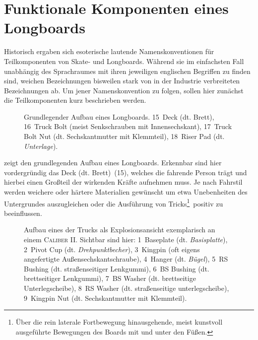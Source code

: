 	\section{Funktionale Komponenten eines Longboards}
		Historisch ergaben sich esoterische lautende Namenskonventionen für Teilkomponenten von Skate- und Longboards.
		Während sie im einfachsten Fall unabhängig des Sprachraumes mit ihren jeweiligen englischen Begriffen zu finden sind, weichen Bezeichnungen bisweilen stark von in der Industrie verbreiteten Bezeichnungen ab.
		Um jener Namenskonvention zu folgen, sollen hier zunächst die Teilkomponenten kurz beschrieben werden.\par\medskip
		\begin{figure}[h]
			\centering
			
			\caption[Grundlegender Aufbau eines Longboards]{Grundlegender Aufbau eines Longboards. 15~Deck (dt. Brett), 16~Truck Bolt (meist Senkschrauben mit Innensechskant), 17~Truck Bolt Nut (dt. Sechskantmutter mit Klemmteil), 18~Riser Pad (dt. \textit{Unterlage}).}\label{fig:longboard}
		\end{figure}
		 zeigt den grundlegenden Aufbau eines Longboards.
		Erkennbar sind hier vordergründig das Deck (dt. Brett)~(15), welches die fahrende Person trägt und hierbei einen Großteil der wirkenden Kräfte aufnehmen muss.
		Je nach Fahrstil werden weichere oder härtere Materialien gewünscht um etwa Unebenheiten des Untergrundes auszugleichen oder die Ausführung von Tricks\footnote{\hspace{1mm} Über die rein laterale Fortbewegung hinausgehende, meist kunstvoll ausgeführte Bewegungen des Boards mit und unter den Füßen.}~positiv zu beeinflussen.
		\begin{figure}[h]
			\centering
			
			\caption[Explosionsansicht eines der Trucks]{Aufbau eines der Trucks als Explosionsansicht exemplarisch an einem \textsc{Caliber II}. Sichtbar sind hier: 1~Baseplate (dt. \textit{Basisplatte}), 2~Pivot Cup (dt. \textit{Drehpunktbecher}), 3~Kingpin (oft eigens angefertigte Außensechskantschraube), 4~Hanger (dt. \textit{Bügel}), 5~RS Bushing (dt. straßenseitiger Lenkgummi), 6~BS Bushing (dt. brettseitiger Lenkgummi), 7~BS Washer (dt. brettseitige Unterlegscheibe), 8~RS Washer (dt. straßenseitige unterlegscheibe), 9~Kingpin Nut (dt. Sechskantmutter mit Klemmteil).}\label{fig:caliper exploded}
		\end{figure}

